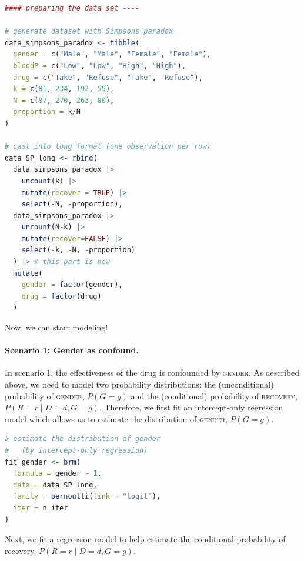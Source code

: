 \documentclass[nobib]{tufte-handout}
\begin{document}
\begin{minipage}[]{\textwidth}
\begin{lstlisting}[language=R]
#### preparing the data set ----

# generate dataset with Simpsons paradox
data_simpsons_paradox <- tibble(
  gender = c("Male", "Male", "Female", "Female"),
  bloodP = c("Low", "Low", "High", "High"),
  drug = c("Take", "Refuse", "Take", "Refuse"),
  k = c(81, 234, 192, 55),
  N = c(87, 270, 263, 80),
  proportion = k/N
)

# cast into long format (one observation per row)
data_SP_long <- rbind(
  data_simpsons_paradox |>
    uncount(k) |>
    mutate(recover = TRUE) |>
    select(-N, -proportion),
  data_simpsons_paradox |>
    uncount(N-k) |>
    mutate(recover=FALSE) |>
    select(-k, -N, -proportion)
  ) |> # this part is new
  mutate(
    gender = factor(gender),
    drug = factor(drug)
  )
\end{lstlisting}
\end{minipage}

\vspace{-0.5cm}
Now, we can start modeling!

\paragraph{Scenario 1: Gender as confound.}
In scenario 1, the effectiveness of the drug is confounded by \textsc{gender}.
As described above, we need to model two probability distributions:
the (unconditional) probability of \textsc{gender}, $P\left( G=g \right)$ and
the (conditional) probability of \textsc{recovery}, $P\left(R = r \mid D=d, G=g \right)$.
Therefore, we first fit an intercept-only regression model which allows us to estimate the distribution of \textsc{gender}, $P\left( G=g \right)$.

\begin{minipage}[]{\textwidth}
\begin{lstlisting}[language=R]
# estimate the distribution of gender
#   (by intercept-only regression)
fit_gender <- brm(
  formula = gender ~ 1,
  data = data_SP_long,
  family = bernoulli(link = "logit"),
  iter = n_iter
)
\end{lstlisting}
\end{minipage}

\vspace{-0.5cm}

Next, we fit a regression model to help estimate the conditional probability of recovery, $P\left(R = r \mid D=d, G=g \right)$.
\end{document}
